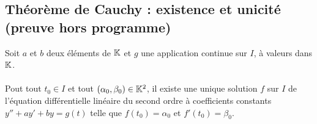 \subsection{Théorème de Cauchy : existence et unicité (preuve hors programme)}
\begin{defprop}
    Soit \(a\) et \(b\) deux éléments de \(\mathbb{K}\) et \(g\) une application continue sur \(I\), à valeurs dans \(\mathbb{K}\).\\~\\

    Pout tout \(t_0 \in I\) et tout \((\alpha_0, \beta_0) \in \mathbb{K}^2\), il existe une unique solution \(f\) sur \(I\) de l’équation différentielle linéaire du second ordre à coefficients constants \(y'' + ay' + by = g(t)\) telle que \(f (t_0) = \alpha_0\) et \(f'(t_0) = \beta_0\).
\end{defprop}